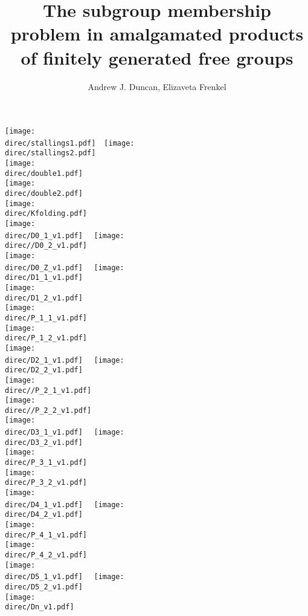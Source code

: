 \documentclass[a4paper,12pt]{article}
\title{The subgroup membership problem in amalgamated products of 
finitely generated free groups
}
\author{Andrew J. Duncan, Elizaveta Frenkel}
\newcommand{\direc}{input_K}
\numberwithin{equation}{section}
\numberwithin{figure}{section}
\begin{document}
\texttt{[image: \\direc/stallings1.pdf]}~~\texttt{[image: \\direc/stallings2.pdf]}\\
\texttt{[image: \\direc/double1.pdf]}\\
\texttt{[image: \\direc/double2.pdf]}\\
\texttt{[image: \\direc/Kfolding.pdf]}\\
\texttt{[image: \\direc/D0\_1\_v1.pdf]}~~
\texttt{[image: \\direc//D0\_2\_v1.pdf]}\\
\texttt{[image: \\direc/D0\_Z\_v1.pdf]}~~
\texttt{[image: \\direc/D1\_1\_v1.pdf]}\\
\texttt{[image: \\direc/D1\_2\_v1.pdf]}\\
\texttt{[image: \\direc/P\_1\_1\_v1.pdf]}\\
\texttt{[image: \\direc/P\_1\_2\_v1.pdf]}\\
\texttt{[image: \\direc/D2\_1\_v1.pdf]}~~
\texttt{[image: \\direc/D2\_2\_v1.pdf]}\\
\texttt{[image: \\direc//P\_2\_1\_v1.pdf]}\\
\texttt{[image: \\direc//P\_2\_2\_v1.pdf]}\\
\texttt{[image: \\direc/D3\_1\_v1.pdf]}~~
\texttt{[image: \\direc/D3\_2\_v1.pdf]}\\
\texttt{[image: \\direc/P\_3\_1\_v1.pdf]}\\
\texttt{[image: \\direc/P\_3\_2\_v1.pdf]}\\
\texttt{[image: \\direc/D4\_1\_v1.pdf]}~~
\texttt{[image: \\direc/D4\_2\_v1.pdf]}\\
\texttt{[image: \\direc/P\_4\_1\_v1.pdf]}\\
\texttt{[image: \\direc/P\_4\_2\_v1.pdf]}\\
\texttt{[image: \\direc/D5\_1\_v1.pdf]}~~
\texttt{[image: \\direc/D5\_2\_v1.pdf]}\\
\texttt{[image: \\direc/Dn\_v1.pdf]}\\
\end{document}
